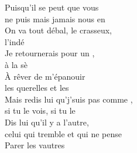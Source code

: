 \songwordfb{} Puisqu'il se peut que vous \\
ne puis mais jamais nous en \\
On va tout débal, le crasseux, \\
l'indé \\
Je retournerais pour un , \\
à la sè \\
À rêver de m'épanouir  \\
les querelles et les  \\
Mais redis lui qu'j'suis pas comme , \\
si tu le vois, si tu le  \\
Dis lui qu'il y a l'autre,\songwordfb{}\\
celui qui tremble et qui ne pense  \\
Parer les vautres \\